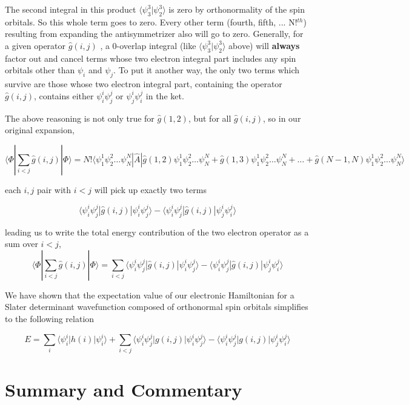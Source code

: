 \documentclass[11pt]{article}
\begin{document}
The second integral in this product
\(\langle \psi_3^3 | \psi_2^3 \rangle\) is zero by orthonormality of the
spin orbitals. So this whole term goes to zero. Every other term
(fourth, fifth, ... N!$^{th}$) resulting from expanding the antisymmetrizer
also will go to zero. Generally, for a given operator \(\hat{g}(i,j)\) ,
a 0-overlap integral (like \(\langle \psi_3^3 | \psi_2^3 \rangle\)
above) will \textbf{always} factor out and cancel terms whose two
electron integral part includes any spin orbitals other than \(\psi_i\)
and \(\psi_j\). To put it another way, the only two terms which survive
are those whose two electron integral part, containing the operator
\(\hat{g}(i,j)\), contains either \(\psi_i^i\psi_j^j\) or
\(\psi_j^i\psi_i^j\) in the ket.

The above reasoning is not only true for \(\hat{g}(1,2)\), but for all
\(\hat{g}(i,j)\), so in our original expansion,

\[\langle \Phi | \sum\limits_{i < j} \hat{g}(i,j) | \Phi \rangle  = N! \langle \psi_1^1 \psi_2^2  \dots \psi_N^N | \hat{A} |  \hat{g}(1,2) \psi_1^1 \psi_2^2  \dots \psi_N^N + \hat{g}(1,3) \psi_1^1 \psi_2^2  \dots \psi_N^N + \dots + \hat{g}(N-1,N) \psi_1^1 \psi_2^2  \dots \psi_N^N  \rangle \]

each \(i,j\) pair with \(i < j\) will pick up exactly two terms

\[ \langle \psi_i^i \psi_j^j | \hat{g}(i,j)| \psi_i^i \psi_j^j \rangle - \langle \psi_i^i \psi_j^j | \hat{g}(i,j)| \psi_j^i \psi_i^j \rangle \]

leading us to write the total energy contribution of the two electron
operator as a sum over \(i < j\),
\[\langle \Phi | \sum\limits_{i < j} \hat{g}(i,j) | \Phi \rangle = \sum\limits_{i < j}  \langle \psi_i^i \psi_j^j | \hat{g}(i,j)| \psi_i^i \psi_j^j \rangle - \langle \psi_i^i \psi_j^j | \hat{g}(i,j)| \psi_j^i \psi_i^j \rangle \]

We have shown that the expectation value of our electronic Hamiltonian
for a Slater determinant wavefunction composed of orthonormal spin
orbitals simplifies to the following relation

\[ E =  \sum\limits_{i} \langle\psi_i^i|h(i)|\psi_i^i \rangle + \sum\limits_{i<j}  \langle \psi_i^i\psi_j^j|g(i,j)|\psi_i^i\psi_j^j \rangle - \langle \psi_i^i\psi_j^j|g(i,j)|\psi_j^i\psi_i^j \rangle \]

\section{Summary and Commentary}\label{summary-and-commentary}
\end{document}
